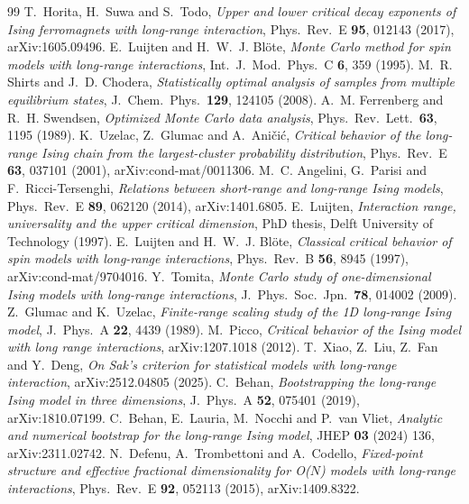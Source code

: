 \documentclass[10pt,a4paper]{article}
\begin{document}
\begin{thebibliography}{99}
 T.~Horita, H.~Suwa and S.~Todo, \emph{Upper and lower critical decay exponents of Ising ferromagnets with long-range interaction}, Phys.\ Rev.\ E \textbf{95}, 012143 (2017), arXiv:1605.09496.
 E.~Luijten and H.~W.~J. Bl\"ote, \emph{Monte Carlo method for spin models with long-range interactions}, Int.\ J.\ Mod.\ Phys.\ C \textbf{6}, 359 (1995).
 M.~R. Shirts and J.~D. Chodera, \emph{Statistically optimal analysis of samples from multiple equilibrium states}, J.\ Chem.\ Phys.\ \textbf{129}, 124105 (2008).
 A.~M. Ferrenberg and R.~H. Swendsen, \emph{Optimized Monte Carlo data analysis}, Phys.\ Rev.\ Lett.\ \textbf{63}, 1195 (1989).
 K.~Uzelac, Z.~Glumac and A.~Ani\v{c}i\'c, \emph{Critical behavior of the long-range Ising chain from the largest-cluster probability distribution}, Phys.\ Rev.\ E \textbf{63}, 037101 (2001), arXiv:cond-mat/0011306.
 M.~C. Angelini, G.~Parisi and F.~Ricci-Tersenghi, \emph{Relations between short-range and long-range Ising models}, Phys.\ Rev.\ E \textbf{89}, 062120 (2014), arXiv:1401.6805.
 E.~Luijten, \emph{Interaction range, universality and the upper critical dimension}, PhD thesis, Delft University of Technology (1997).
 E.~Luijten and H.~W.~J. Bl\"ote, \emph{Classical critical behavior of spin models with long-range interactions}, Phys.\ Rev.\ B \textbf{56}, 8945 (1997), arXiv:cond-mat/9704016.
 Y.~Tomita, \emph{Monte Carlo study of one-dimensional Ising models with long-range interactions}, J.\ Phys.\ Soc.\ Jpn.\ \textbf{78}, 014002 (2009).
 Z.~Glumac and K.~Uzelac, \emph{Finite-range scaling study of the 1D long-range Ising model}, J.\ Phys.\ A \textbf{22}, 4439 (1989).
 M.~Picco, \emph{Critical behavior of the Ising model with long range interactions}, arXiv:1207.1018 (2012).
 T.~Xiao, Z.~Liu, Z.~Fan and Y.~Deng, \emph{On Sak's criterion for statistical models with long-range interaction}, arXiv:2512.04805 (2025).
 C.~Behan, \emph{Bootstrapping the long-range Ising model in three dimensions}, J.\ Phys.\ A \textbf{52}, 075401 (2019), arXiv:1810.07199.
 C.~Behan, E.~Lauria, M.~Nocchi and P.~van Vliet, \emph{Analytic and numerical bootstrap for the long-range Ising model}, JHEP \textbf{03} (2024) 136, arXiv:2311.02742.
 N.~Defenu, A.~Trombettoni and A.~Codello, \emph{Fixed-point structure and effective fractional dimensionality for O($N$) models with long-range interactions}, Phys.\ Rev.\ E \textbf{92}, 052113 (2015), arXiv:1409.8322.
\end{thebibliography}
\end{document}
